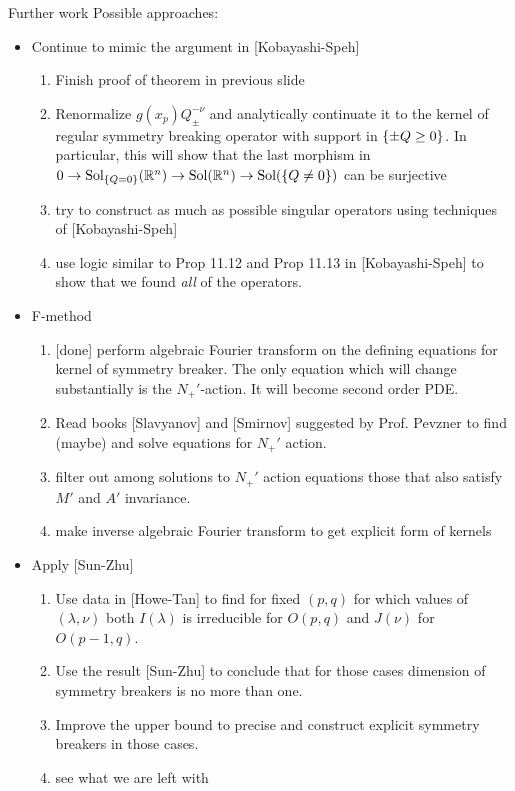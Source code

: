 \documentclass[8pt]{beamer}
\newcommand{\Sol}{\mbox{Sol}}
\theoremstyle{mystyle}
\begin{document}
\begin{frame}{Further work}%
	Possible approaches:
	\begin{itemize}
		\item Continue to mimic the argument in [Kobayashi-Speh]
			\begin{enumerate}
				\item Finish proof of theorem in previous slide
				\item Renormalize $g(x_p)Q_{\pm}^{-\nu}$ and analytically continuate it to the kernel of 
					regular symmetry breaking operator with support in $\left\{\pm Q\geq0\right\}$. In particular,
					this will show that the last morphism in
					$0\rightarrow \Sol_{\mycbra{Q=0}}(\R^n)\rightarrow \Sol(\R^n)\rightarrow\Sol(
					\mycbra{Q\neq0})$ can be surjective\footnotemark
				\item try to construct as much as possible singular operators using techniques of [Kobayashi-Speh]
				\item use logic similar to Prop 11.12 and Prop 11.13 in [Kobayashi-Speh] to show that we found 
					{\it all} of the operators.
			\end{enumerate}
		\item F-method
			\begin{enumerate}
				\item {[done]} perform algebraic Fourier transform on the defining equations for kernel of symmetry
					breaker. The only equation which will change substantially is the $N_+'$-action. It will
					become second order PDE.
				\item Read books [Slavyanov] and [Smirnov] suggested by Prof. Pevzner to find (maybe) and solve
					equations for $N_+'$ action.
				\item filter out among solutions to $N_+'$ action equations those that also satisfy $M'$ and $A'$
					invariance.
				\item make inverse algebraic Fourier transform to get explicit form of kernels
			\end{enumerate}
		\item Apply [Sun-Zhu]
			\begin{enumerate}
				\item Use data in [Howe-Tan] to find for fixed $(p,q)$ for which values of $(\lambda,\nu)$ both
					$I(\lambda)$ is irreducible for $O(p,q)$ and $J(\nu)$ for $O(p-1,q)$.
				\item Use the result [Sun-Zhu] to conclude that for those cases dimension of symmetry breakers
					is no more than one.
				\item Improve the upper bound to precise and construct explicit symmetry breakers in those cases.
				\item see what we are left with
			\end{enumerate}
	\end{itemize}
\end{frame}
\end{document}
